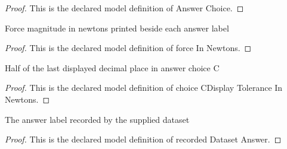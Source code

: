 \begin{proof}
  This is the declared model definition of Answer Choice.
\end{proof}
\begin{definition}
  \label{def:physics:phyx-mini-0911:phyxminiproblems-problemphyxmini0911-answerchoice-forceinnewtons}
  Force magnitude in newtons printed beside each answer label
\end{definition}
\begin{proof}
  This is the declared model definition of force In Newtons.
\end{proof}
\begin{definition}
  \label{def:physics:phyx-mini-0911:phyxminiproblems-problemphyxmini0911-choicecdisplaytoleranceinnewtons}
  Half of the last displayed decimal place in answer choice C
\end{definition}
\begin{proof}
  This is the declared model definition of choice CDisplay Tolerance In Newtons.
\end{proof}
\begin{definition}
  \label{def:physics:phyx-mini-0911:phyxminiproblems-problemphyxmini0911-recordeddatasetanswer}
  The answer label recorded by the supplied dataset
\end{definition}
\begin{proof}
  This is the declared model definition of recorded Dataset Answer.
\end{proof}
